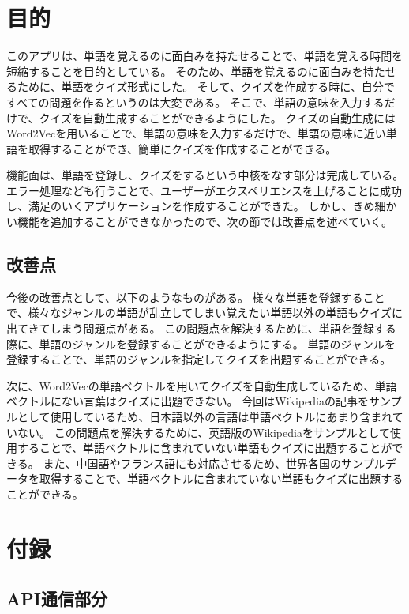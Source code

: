 \documentclass[11pt,a4paper]{jsarticle}
\begin{document}
\section{目的}
このアプリは、単語を覚えるのに面白みを持たせることで、単語を覚える時間を短縮することを目的としている。
そのため、単語を覚えるのに面白みを持たせるために、単語をクイズ形式にした。
そして、クイズを作成する時に、自分ですべての問題を作るというのは大変である。
そこで、単語の意味を入力するだけで、クイズを自動生成することができるようにした。
クイズの自動生成にはWord2Vecを用いることで、単語の意味を入力するだけで、単語の意味に近い単語を取得することができ、簡単にクイズを作成することができる。

機能面は、単語を登録し、クイズをするという中核をなす部分は完成している。
エラー処理なども行うことで、ユーザーがエクスペリエンスを上げることに成功し、満足のいくアプリケーションを作成することができた。
しかし、きめ細かい機能を追加することができなかったので、次の節では改善点を述べていく。


\subsection{改善点}
今後の改善点として、以下のようなものがある。
様々な単語を登録することで、様々なジャンルの単語が乱立してしまい覚えたい単語以外の単語もクイズに出てきてしまう問題点がある。
この問題点を解決するために、単語を登録する際に、単語のジャンルを登録することができるようにする。
単語のジャンルを登録することで、単語のジャンルを指定してクイズを出題することができる。

次に、Word2Vecの単語ベクトルを用いてクイズを自動生成しているため、単語ベクトルにない言葉はクイズに出題できない。
今回はWikipediaの記事をサンプルとして使用しているため、日本語以外の言語は単語ベクトルにあまり含まれていない。
この問題点を解決するために、英語版のWikipediaをサンプルとして使用することで、単語ベクトルに含まれていない単語もクイズに出題することができる。
また、中国語やフランス語にも対応させるため、世界各国のサンプルデータを取得することで、単語ベクトルに含まれていない単語もクイズに出題することができる。

\section{付録}

\subsection{API通信部分}
\end{document}
